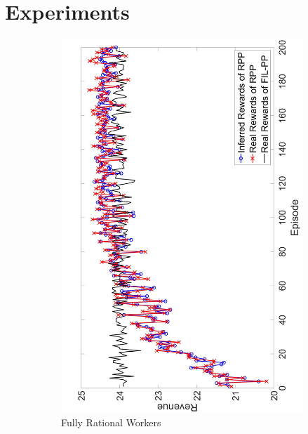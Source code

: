 \documentclass{article}
\begin{document}
\section{Experiments}
\vspace{-4mm}
\begin{figure}[htb]
    \centering
    \hspace{-1mm}
    \begin{subfigure}[t]{0.35\textwidth}
        \centering
        \includegraphics[width=\textwidth]{image/1}
        \caption{\label{E1} Fully Rational Workers}
    \end{subfigure}%
    ~\hspace{-6mm}
    \begin{subfigure}[t]{0.35\textwidth}

\end{subfigure}
\end{figure}
\end{document}
